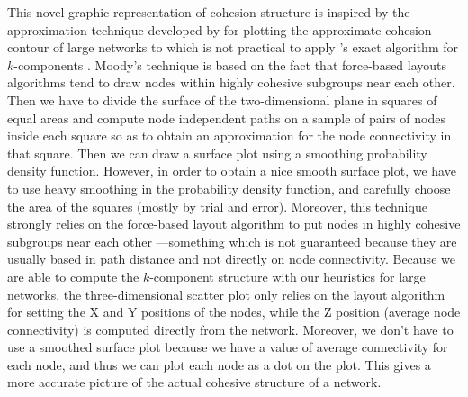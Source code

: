 This novel graphic representation of cohesion structure is inspired by the approximation technique developed by \citet{moody:2004} for plotting the approximate cohesion contour of large networks to which is not practical to apply \citeauthor{moody:2003}'s exact algorithm for $k$-components \citeyear{moody:2003}. Moody's technique is based on the fact that force-based layouts algorithms tend to draw nodes within highly cohesive subgroups near each other. Then we have to divide the surface of the two-dimensional plane in squares of equal areas and compute node independent paths on a sample of pairs of nodes inside each square so as to obtain an approximation for the node connectivity in that square. Then we can draw a surface plot using a smoothing probability density function. However, in order to obtain a nice smooth surface plot, we have to use heavy smoothing in the probability density function, and carefully choose the area of the squares (mostly by trial and error). Moreover, this technique strongly relies on the force-based layout algorithm to put nodes in highly cohesive subgroups near each other ---something which is not guaranteed because they are usually based in path distance and not directly on node connectivity. Because we are able to compute the $k$-component structure with our heuristics for large networks, the three-dimensional scatter plot only relies on the layout algorithm for setting the X and Y positions of the nodes, while the Z position (average node connectivity) is computed directly from the network. Moreover, we don't have to use a smoothed surface plot because we have a value of average connectivity for each node, and thus we can plot each node as a dot on the plot. This gives a more accurate picture of the actual cohesive structure of a network.


